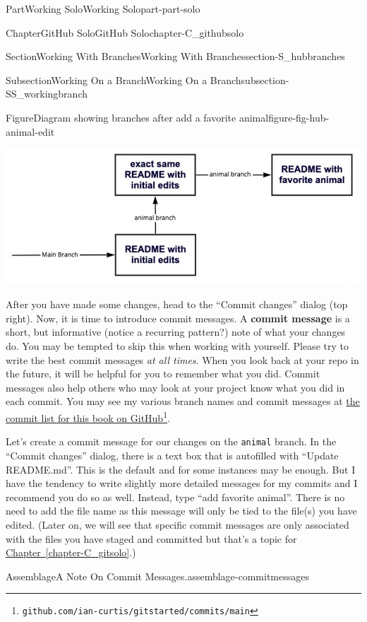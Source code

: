 \documentclass[oneside,10pt,]{book}
\newcommand{\xreffont}{\relax}
\newcommand{\mono}[1]{\texttt{#1}}
\newcommand{\terminology}[1]{\textbf{#1}}
\begin{document}
\begin{partptx}{Part}{Working Solo}{}{Working Solo}{}{}{part-part-solo}
\begin{chapterptx}{Chapter}{GitHub Solo}{}{GitHub Solo}{}{}{chapter-C_githubsolo}
\begin{sectionptx}{Section}{Working With Branches}{}{Working With Branches}{}{}{section-S_hubbranches}
\begin{subsectionptx}{Subsection}{Working On a Branch}{}{Working On a Branch}{}{}{subsection-SS_workingbranch}
\begin{figureptx}{Figure}{Diagram showing branches after add a favorite animal}{figure-fig-hub-animal-edit}{}
\begin{image}{0}{1}{0}{}
\includegraphics[width=\linewidth]{external/hub_animal_edit.pdf}
\end{image}%
\tcblower
\end{figureptx}%
 After you have made some changes, head to the ``Commit changes'' dialog (top right). Now, it is time to introduce commit messages. A \terminology{commit message} is a short, but informative (notice a recurring pattern?) note of what your changes do. You may be tempted to skip this when working with yourself. Please try to write the best commit messages \emph{at all times}. When you look back at your repo in the future, it will be helpful for you to remember what you did. Commit messages also help others who may look at your project know what you did in each commit. You may see my various branch names and commit messages at \href{https://github.com/ian-curtis/gitstarted/commits/main}{the commit list for this book on GitHub}\footnote{\nolinkurl{github.com/ian-curtis/gitstarted/commits/main}\label{fn-SS_workingbranch-g-h}}.%
\par
Let's create a commit message for our changes on the \mono{animal} branch. In the ``Commit changes'' dialog, there is a text box that is autofilled with ``Update README.md''. This is the default and for some instances may be enough. But I have the tendency to write slightly more detailed messages for my commits and I recommend you do so as well. Instead, type ``add favorite animal''. There is no need to add the file name as this message will only be tied to the file(s) you have edited. (Later on, we will see that specific commit messages are only associated with the files you have staged and committed but that's a topic for \hyperref[chapter-C_gitsolo]{Chapter~{\xreffont\ref{chapter-C_gitsolo}}}.)%
\begin{assemblage}{Assemblage}{A Note On Commit Messages.}{assemblage-commitmessages}%

\end{assemblage}
\end{subsectionptx}
\end{sectionptx}
\end{chapterptx}
\end{partptx}
\end{document}
